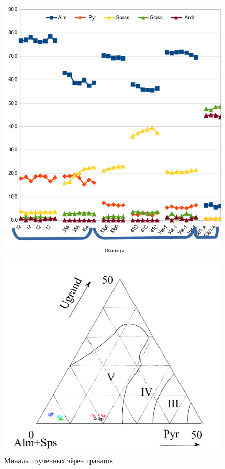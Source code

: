 \begin{figure}[H]
\begin{changemargin}{0cm}{0cm}
  \begin{center}
    \begin{minipage}[h]{0.45\linewidth}
        \includegraphics[width=1\textwidth]{authors/polzunenkov-fig2.png}
        \caption{Миналы изученных зёрен гранатов}
        \label{fig:polzunenkov-fig2}
    \end{minipage}
\hfill
    \begin{minipage}[h]{0.5\linewidth}
      \begin{center}
              \includegraphics[width=1\textwidth]{authors/polzunenkov-fig3.png}
      \end{center}


\end{minipage}
\end{center}
\end{changemargin}
\end{figure}
